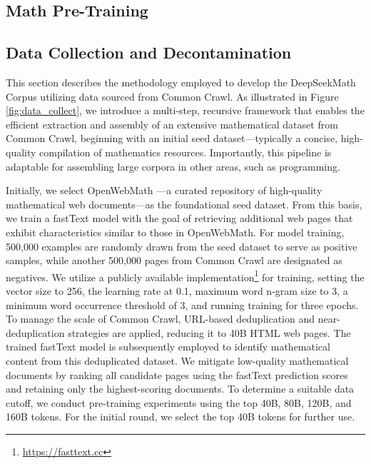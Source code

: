 \begin{itemize}[topsep=0pt]
\section{Math Pre-Training}

\subsection{Data Collection and Decontamination} This section describes the methodology employed to develop the DeepSeekMath Corpus utilizing data sourced from Common Crawl. As illustrated in Figure \ref{fig:data_collect}, we introduce a multi-step, recursive framework that enables the efficient extraction and assembly of an extensive mathematical dataset from Common Crawl, beginning with an initial seed dataset—typically a concise, high-quality compilation of mathematics resources. Importantly, this pipeline is adaptable for assembling large corpora in other areas, such as programming.

Initially, we select OpenWebMath \citep{openwebmath}—a curated repository of high-quality mathematical web documents—as the foundational seed dataset. From this basis, we train a fastText model \citep{joulin2016fasttext} with the goal of retrieving additional web pages that exhibit characteristics similar to those in OpenWebMath. For model training, 500,000 examples are randomly drawn from the seed dataset to serve as positive samples, while another 500,000 pages from Common Crawl are designated as negatives. We utilize a publicly available implementation\footnote{\url{https://fasttext.cc}} for training, setting the vector size to 256, the learning rate at 0.1, maximum word n-gram size to 3, a minimum word occurrence threshold of 3, and running training for three epochs. To manage the scale of Common Crawl, URL-based deduplication and near-deduplication strategies are applied, reducing it to 40B HTML web pages. The trained fastText model is subsequently employed to identify mathematical content from this deduplicated dataset. We mitigate low-quality mathematical documents by ranking all candidate pages using the fastText prediction scores and retaining only the highest-scoring documents. To determine a suitable data cutoff, we conduct pre-training experiments using the top 40B, 80B, 120B, and 160B tokens. For the initial round, we select the top 40B tokens for further use.


\end{itemize}
